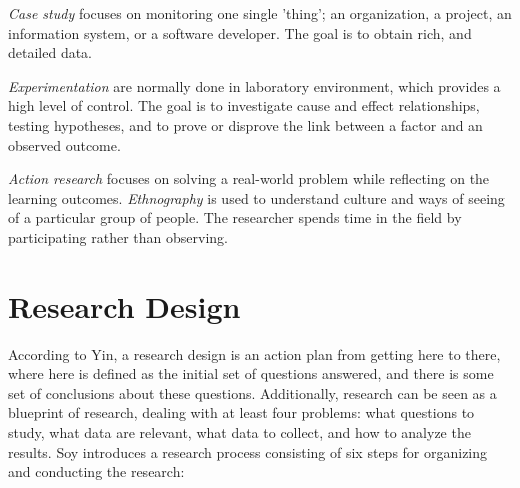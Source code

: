\textit{{Case study}} focuses on monitoring one single 'thing'; an organization, a project, an information system, or a software developer. The goal is to obtain rich, and detailed data. 

\textit{{Experimentation}} are normally done in laboratory environment, which provides a high level of control. The goal is to investigate cause and effect relationships, testing hypotheses, and to prove or disprove the link between a factor and an observed outcome. 

\textit{{Action research}} focuses on solving a real-world problem while reflecting on the learning outcomes. \textit{{Ethnography}} is used to understand culture and ways of seeing of a particular group of people. The researcher spends time in the field by participating rather than observing.

\section{Research Design}

According to Yin\cite{yin2003case}, a research design is an action plan from getting here to there, where here is defined as the initial set of questions answered, and there is some set of conclusions about these questions. Additionally, research can be seen as a blueprint of research, dealing with at least four problems: what questions to study, what data are relevant, what data to collect, and how to analyze the results\cite{yin2003case}. Soy\cite{soysusan} introduces a research process consisting of six steps for organizing and conducting the research:

